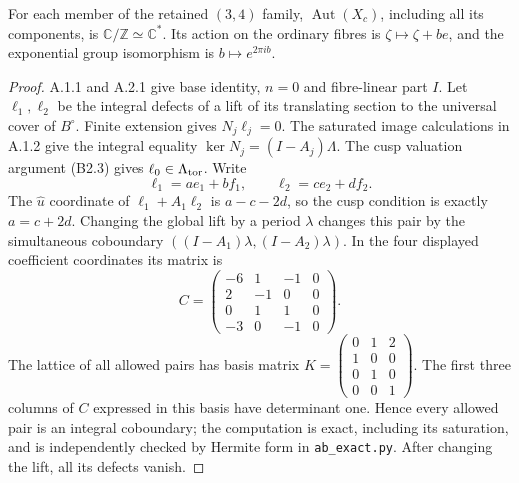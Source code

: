 \begin{proposition}\label{fam:src:B.4.1}\label{fam:st:B.4.1}
For each member of the retained $(3,4)$ family, $\operatorname{Aut}(X_c)$, including all its components, is $\mathbb C/\mathbb Z\simeq\mathbb C^*$. Its action on the ordinary fibres is $\zeta\mapsto\zeta+be$, and the exponential group isomorphism is $b\mapsto e^{2\pi ib}$.
\end{proposition}
\begin{proof}
A.1.1 and A.2.1 give base identity, $n=0$ and fibre-linear part $I$. Let $\ell_1,\ell_2$ be the integral defects of a lift of its translating section to the universal cover of $B^\circ$. Finite extension gives $N_j\ell_j=0$. The saturated image calculations in A.1.2 give the integral equality $\ker N_j=(I-A_j)\Lambda$. The cusp valuation argument (B2.3) gives $\ell_0\in\Lambda_{\rm tor}$. Write
\[
 \ell_1=ae_1+bf_1,\qquad \ell_2=ce_2+df_2.
\]
The $\widehat u$ coordinate of $\ell_1+A_1\ell_2$ is $a-c-2d$, so the cusp condition is exactly $a=c+2d$. Changing the global lift by a period $\lambda$ changes this pair by the simultaneous coboundary $((I-A_1)\lambda,(I-A_2)\lambda)$. In the four displayed coefficient coordinates its matrix is
\[
 C=\begin{pmatrix}-6&1&-1&0\\2&-1&0&0\\0&1&1&0\\-3&0&-1&0\end{pmatrix}.
\]
The lattice of all allowed pairs has basis matrix
$K=\left(\begin{smallmatrix}0&1&2\\1&0&0\\0&1&0\\0&0&1\end{smallmatrix}\right)$. The first three columns of $C$ expressed in this basis have determinant one. Hence every allowed pair is an integral coboundary; the computation is exact, including its saturation, and is independently checked by Hermite form in \texttt{ab\_exact.py}. After changing the lift, all its defects vanish.


\end{proof}
